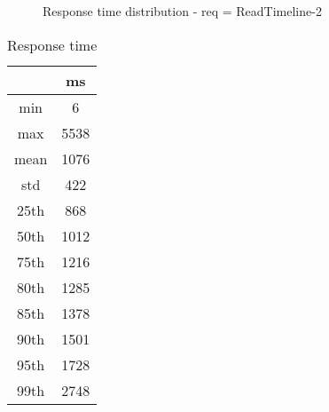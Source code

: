 \begin{minipage}{0.75\linewidth}
\begin{figure}[h]
\begin{adjustbox}{max width=1.0\linewidth, keepaspectratio}
  \end{adjustbox}
  \caption{Response time distribution - req = ReadTimeline-2}
\end{figure}
\end{minipage}\hfill\begin{minipage}{0.18\linewidth}
\begin{table}[h]
\begin{tabular}{|cc|}
\hline
\textbf{} & \textbf{ms}\\ \hline
 \Xhline{0.005\arrayrulewidth}
min & 6\\
 \Xhline{0.005\arrayrulewidth}
max & 5538\\
 \Xhline{0.005\arrayrulewidth}
mean & 1076\\
 \Xhline{0.005\arrayrulewidth}
std & 422\\
\hline
\hline
 \Xhline{0.005\arrayrulewidth}
25th & 868\\
 \Xhline{0.005\arrayrulewidth}
50th & 1012\\
 \Xhline{0.005\arrayrulewidth}
75th & 1216\\
 \Xhline{0.005\arrayrulewidth}
80th & 1285\\
 \Xhline{0.005\arrayrulewidth}
85th & 1378\\
 \Xhline{0.005\arrayrulewidth}
90th & 1501\\
 \Xhline{0.005\arrayrulewidth}
95th & 1728\\
 \Xhline{0.005\arrayrulewidth}
99th & 2748\\
\hline
\end{tabular}
\caption{Response time}
\end{table}
\end{minipage}\hfill